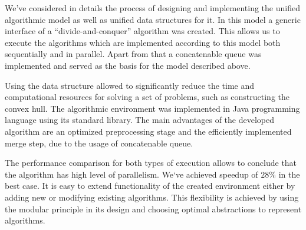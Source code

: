 \documentclass[a4paper,english,numberwithinsect,notab]{eurocg20-submission}
\begin{document}
	We've considered in details the process of designing and implementing the unified algorithmic model as well as unified data structures for it. In this model a generic interface of a ``divide-and-conquer'' algorithm was created. This allows us to execute the algorithms which are implemented according to this model both sequentially and in parallel. Apart from that a concatenable queue was implemented and served as the basis for the model described above.
	
	Using the data structure allowed to significantly reduce the time and computational resources for solving a set of problems, such as constructing the convex hull. The algorithmic environment was implemented in Java programming language using its standard library. The main advantages of the developed algorithm are an optimized preprocessing stage and the efficiently implemented merge step, due to the usage of concatenable queue.
	
	The performance comparison for both types of execution allows to conclude that the algorithm has high level of parallelism. We`ve achieved speedup of $28\%$ in the best case. It is easy to extend functionality of the created environment either by adding new or modifying existing algorithms. This flexibility is achieved by using the modular principle in its design and choosing optimal abstractions to represent algorithms.


\end{document}
